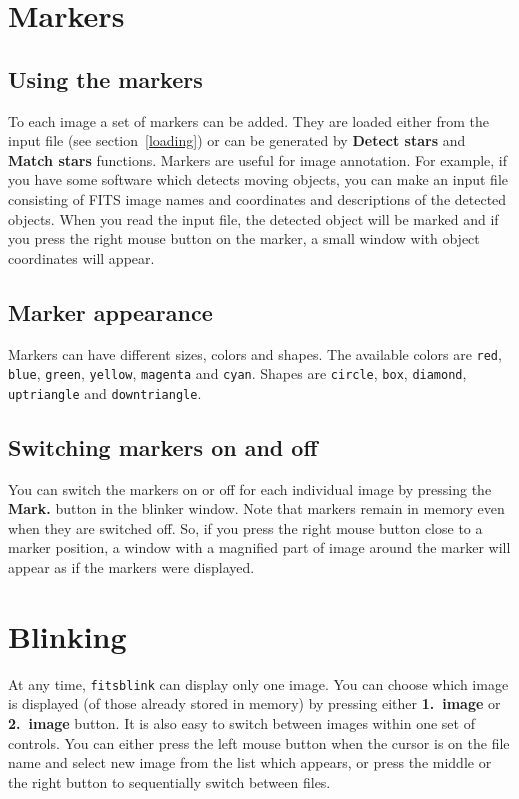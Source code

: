 \documentclass[11pt]{article}
\begin{document}
 
\section{Markers}
\label{markers}
\subsection{Using the markers}
To each image a set of markers can be added.  They are loaded either
from the input file (see section~\ref{loading}) or can be generated by
\textbf{Detect stars} and \textbf{Match stars} functions.  Markers are
useful for image annotation.  For example, if you have some software
which detects moving objects, you can make an input file consisting of
FITS image names and coordinates and descriptions of the detected
objects.  When you read the input file, the detected object will be
marked and if you press the right mouse button on the marker, a small
window with object coordinates will appear.

\subsection{Marker appearance}
Markers can have different sizes, colors and shapes.  The available
colors are \verb=red=, \verb=blue=, \verb=green=, \verb=yellow=,
\verb=magenta= and \verb=cyan=.  Shapes are \verb=circle=, \verb=box=,
\verb=diamond=, \verb=uptriangle= and \verb=downtriangle=.  

\subsection{Switching markers on and off}
You can switch the markers on or off for each individual image by
pressing the \textbf{Mark.} button in the blinker window.  Note that
markers remain in memory even when they are switched off.  So, if you
press the right mouse button close to a marker position, a window with
a magnified part of image around the marker will appear as if the
markers were displayed.

\section{Blinking}

At any time, \verb=fitsblink= can display only one image. You can
choose which image is displayed (of those already stored in memory) by
pressing either \textbf{1.~image} or \textbf{2.~image} button.  It is
also easy to switch between images within one set of controls.  You
can either press the left mouse button when the cursor is on the file
name and select new image from the list which appears, or press the
middle or the right button to sequentially switch between files.
\end{document}
